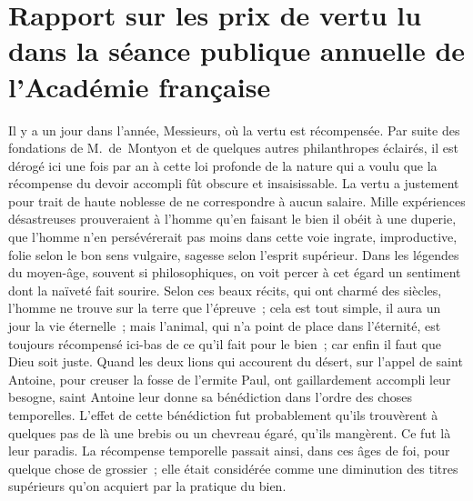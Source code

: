 \documentclass[french,twoside]{book} %
\newcommand\orgName[1]{#1}
\newcommand\persName[1]{#1}
\newcommand{\dateline}[1]{\medskip{\RaggedLeft{#1}\par}\bigskip}
\begin{document}
\section[{Rapport sur les prix de vertu lu dans la séance publique annuelle de l’Académie française}]{Rapport sur les prix de vertu lu dans la séance publique annuelle de l’{\orgName Académie française}}\renewcommand{\leftmark}{Rapport sur les prix de vertu lu dans la séance publique annuelle de l’{\orgName Académie française}}


\dateline{4 août 1881}
\noindent Il y a un jour dans l’année, Messieurs, où la vertu est récompensée. Par suite des fondations de {\persName M. de Montyon} et de quelques autres philanthropes éclairés, il est dérogé ici une fois par an à cette loi profonde de la nature qui a voulu que la récompense du devoir accompli fût obscure et insaisissable. La vertu a justement pour trait de haute noblesse de ne correspondre à aucun salaire. Mille expériences désastreuses prouveraient à l’homme qu’en faisant le bien il obéit à une duperie, que l’homme n’en persévérerait pas moins dans cette voie ingrate, improductive, folie selon le bon sens vulgaire, sagesse selon l’esprit supérieur. Dans les légendes du moyen-âge, souvent si philosophiques, on voit percer à cet égard un sentiment dont la naïveté fait sourire. Selon ces beaux récits, qui ont charmé des siècles, l’homme ne trouve sur la terre que l’épreuve ; cela est tout simple, il aura un jour la vie éternelle ; mais l’animal, qui n’a point de place dans l’éternité, est toujours récompensé ici-bas de ce qu’il fait pour le bien ; car enfin il faut que Dieu soit juste. Quand les deux lions qui accourent du désert, sur l’appel de {\persName saint Antoine}, pour creuser la fosse de l’ermite {\persName Paul}, ont gaillardement accompli leur besogne, {\persName saint Antoine} leur donne sa bénédiction dans l’ordre des choses temporelles. L’effet de cette bénédiction fut probablement qu’ils trouvèrent à quelques pas de là une brebis ou un chevreau égaré, qu’ils mangèrent. Ce fut là leur paradis. La récompense temporelle passait ainsi, dans ces âges de foi, pour quelque chose de grossier ; elle était considérée comme une diminution des titres supérieurs qu’on acquiert par la pratique du bien.\par
\end{document}

